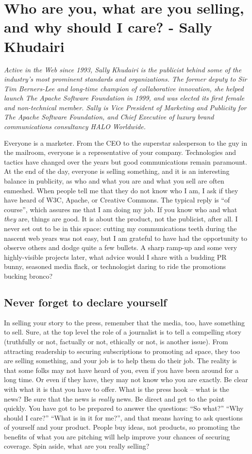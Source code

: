 \chapter{Who are you, what are you selling, and why should I care? - Sally Khudairi}

\textit{Active in the Web since 1993, Sally Khudairi is the publicist behind
some of the industry's most prominent standards and organizations. The former
deputy to Sir Tim Berners-Lee and long-time champion of collaborative
innovation, she helped launch The Apache Software Foundation in 1999, and was
elected its first female and non-technical member. Sally is Vice President of
Marketing and Publicity for The Apache Software Foundation, and Chief Executive
of luxury brand communications consultancy HALO Worldwide.}

Everyone is a marketer. From the CEO to the superstar salesperson to the guy in
the mailroom, everyone is a representative of your company. Technologies and
tactics have changed over the years but good communications remain paramount. At
the end of the day, everyone is selling something, and it is an interesting
balance in publicity, as who and what you are and what you sell are often
enmeshed. When people tell me that they do not know who I am, I ask if they have
heard of W3C, Apache, or Creative Commons. The typical reply is ``of course'',
which assures me that I am doing my job. If you know who and what \textit{they} are,
things are good. It is about the product, not the publicist, after all. I never
set out to be in this space: cutting my communications teeth during the nascent
web years was not easy, but I am grateful to have had the opportunity to observe
others and dodge quite a few bullets. A sharp ramp-up and some very
highly-visible projects later, what advice would I share with a budding PR bunny,
seasoned media flack, or technologist daring to ride the promotions bucking bronco?

\section*{Never forget to declare yourself}
In selling your story to the press, remember that the media, too, have something
to sell. Sure, at the top level the role of a journalist is to tell a compelling
story (truthfully or not, factually or not, ethically or not, is another issue).
From attracting readership to securing subscriptions to promoting ad space, they
too are selling something, and your job is to help them do their job. The
reality is that some folks may not have heard of you, even if you have been around
for a long time. Or even if they have, they may not know who you are exactly. Be
clear with what it is that you have to offer. What is the press hook -- what is
the news? Be sure that the news is \textit{really} news. Be direct and get to the point
quickly. You have got to be prepared to answer the questions: ``So what?'' ``Why
should I care?'' ``What is in it for me?'', and that means having to ask questions
of yourself and your product. People buy ideas, not products, so promoting the
benefits of what you are pitching will help improve your chances of securing coverage.
Spin aside, what are you really selling?

